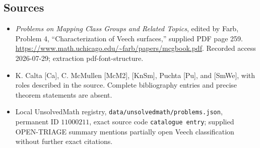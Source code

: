 \documentclass[11pt]{article}
\begin{document}
\subsection{Sources}
\begin{itemize}
\item \emph{Problems on Mapping Class Groups and Related Topics}, edited by Farb, Problem 4, ``Characterization of Veech surfaces,'' supplied PDF page 259. \url{https://www.math.uchicago.edu/~farb/papers/mcgbook.pdf}. Recorded access 2026-07-29; extraction pdf-font-structure.
\item K. Calta [Ca], C. McMullen [McM2], [KnSm], Puchta [Pu], and [SmWe], with roles described in the source. Complete bibliography entries and precise theorem statements are absent.
\item Local UnsolvedMath registry, \texttt{data/unsolvedmath/problems.json}, permanent ID \(11000211\), exact source code \texttt{catalogue entry}; supplied OPEN-TRIAGE summary mentions partially open Veech classification without further exact citations.
\end{itemize}
\end{document}
